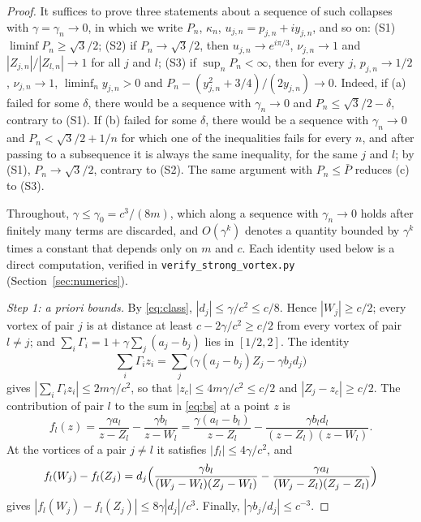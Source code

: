 \documentclass[11pt]{article}
\theoremstyle{definition}
\begin{document}
\begin{proof}
It suffices to prove three statements about a sequence of such collapses with $\gamma = \gamma_n \to 0$, in which we write $P_n$, $\kappa_n$, $u_{j,n} = p_{j,n} + iy_{j,n}$, and so on:
(S1) $\liminf P_n \ge \sqrt{3}/2$;
(S2) if $P_n \to \sqrt{3}/2$, then $u_{j,n} \to e^{i\pi/3}$, $\nu_{j,n} \to 1$ and $|Z_{j,n}|/|Z_{l,n}| \to 1$ for all $j$ and $l$;
(S3) if $\sup_n P_n < \infty$, then for every $j$, $p_{j,n} \to 1/2$, $\nu_{j,n} \to 1$, $\liminf_n y_{j,n} > 0$ and $P_n - (y_{j,n}^2 + 3/4)/(2y_{j,n}) \to 0$.
Indeed, if (a) failed for some $\delta$, there would be a sequence with $\gamma_n \to 0$ and $P_n \le \sqrt{3}/2 - \delta$, contrary to (S1). If (b) failed for some $\delta$, there would be a sequence with $\gamma_n \to 0$ and $P_n < \sqrt{3}/2 + 1/n$ for which one of the inequalities fails for every $n$, and after passing to a subsequence it is always the same inequality, for the same $j$ and $l$; by (S1), $P_n \to \sqrt{3}/2$, contrary to (S2). The same argument with $P_n \le \bar P$ reduces (c) to (S3).

Throughout, $\gamma \le \gamma_0 = c^3/(8m)$, which along a sequence with $\gamma_n \to 0$ holds after finitely many terms are discarded, and $O(\gamma^k)$ denotes a quantity bounded by $\gamma^k$ times a constant that depends only on $m$ and $c$. Each identity used below is a direct computation, verified in \texttt{verify\_\allowbreak strong\_\allowbreak vortex.py} (Section~\ref{sec:numerics}).

\emph{Step 1: a priori bounds.} By \eqref{eq:class}, $|d_j| \le \gamma/c^2 \le c/8$. Hence $|W_j| \ge c/2$; every vortex of pair $j$ is at distance at least $c - 2\gamma/c^2 \ge c/2$ from every vortex of pair $l \ne j$; and $\sum_i \Gamma_i = 1 + \gamma\sum_j (a_j - b_j)$ lies in $[1/2, 2]$. The identity
\begin{equation}\label{eq:zc}
  \sum_i \Gamma_i z_i = \sum_j \bigl(\gamma(a_j - b_j)Z_j - \gamma b_j d_j\bigr)
\end{equation}
gives $|\sum_i \Gamma_i z_i| \le 2m\gamma/c^2$, so that $|z_c| \le 4m\gamma/c^2 \le c/2$ and $|Z_j - z_c| \ge c/2$. The contribution of pair $l$ to the sum in \eqref{eq:bs} at a point $z$ is
\[
  f_l(z) = \frac{\gamma a_l}{z - Z_l} - \frac{\gamma b_l}{z - W_l} = \frac{\gamma(a_l - b_l)}{z - Z_l} - \frac{\gamma b_l d_l}{(z - Z_l)(z - W_l)}.
\]
At the vortices of a pair $j \ne l$ it satisfies $|f_l| \le 4\gamma/c^2$, and
\[
  f_l(W_j) - f_l(Z_j) = d_j\Bigl(\frac{\gamma b_l}{(W_j - W_l)(Z_j - W_l)} - \frac{\gamma a_l}{(W_j - Z_l)(Z_j - Z_l)}\Bigr)
\]
gives $|f_l(W_j) - f_l(Z_j)| \le 8\gamma|d_j|/c^3$. Finally, $|\gamma b_j/d_j| \le c^{-3}$.


\end{proof}
\end{document}
